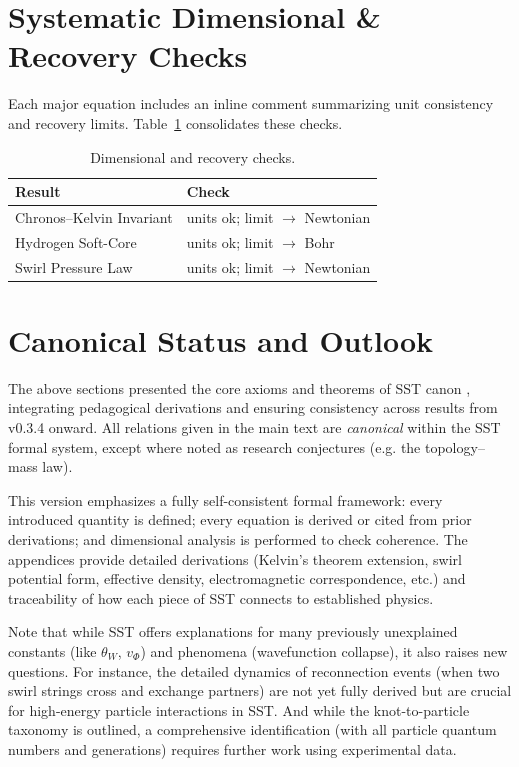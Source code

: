 \documentclass[10pt,reprint,aps,onecolumn,nofootinbib]{revtex4-2}
\begin{document}
    \section{Systematic Dimensional \& Recovery Checks}
    \label{canon58:checks}
    Each major equation includes an inline comment summarizing unit consistency and recovery limits. Table~\ref{canon58:check-table} consolidates these checks.
    \begin{table}[h]
    \centering
    \begin{tabular}{l l}
    Result & Check \\ \hline
    Chronos--Kelvin Invariant & units ok; limit $\to$ Newtonian \\
    Hydrogen Soft-Core & units ok; limit $\to$ Bohr \\
    Swirl Pressure Law & units ok; limit $\to$ Newtonian \\
    \end{tabular}
    \caption{Dimensional and recovery checks.}
    \label{canon58:check-table}
    \end{table}


	\section{Canonical Status and Outlook}
	The above sections presented the core axioms and theorems of SST canon \canonversion, integrating pedagogical derivations and ensuring consistency across results from v0.3.4 onward. All relations given in the main text are \emph{canonical} within the SST formal system, except where noted as research conjectures (e.g. the topology–mass law).

	This version emphasizes a fully self-consistent formal framework: every introduced quantity is defined; every equation is derived or cited from prior derivations; and dimensional analysis is performed to check coherence. The appendices provide detailed derivations (Kelvin’s theorem extension, swirl potential form, effective density, electromagnetic correspondence, etc.) and traceability of how each piece of SST connects to established physics.

	Note that while SST offers explanations for many previously unexplained constants (like $\theta_W$, $v_{\Phi}$) and phenomena (wavefunction collapse), it also raises new questions. For instance, the detailed dynamics of reconnection events (when two swirl strings cross and exchange partners) are not yet fully derived but are crucial for high-energy particle interactions in SST. And while the knot-to-particle taxonomy is outlined, a comprehensive identification (with all particle quantum numbers and generations) requires further work using experimental data.
\end{document}
